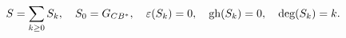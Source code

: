 \begin{equation}\label{4.16}
S=\sum_{k\ge0}S_k,\quad S_0=G_{CB^*},\quad \varepsilon(S_k)=0,\quad
\hbox{gh}(S_k)=0,\quad \hbox{deg}(S_k)=k.
\end{equation}

